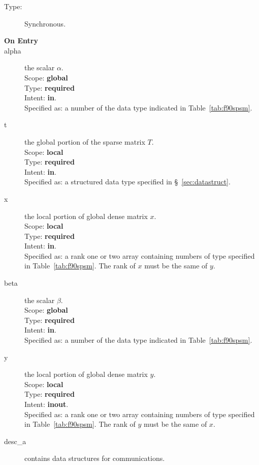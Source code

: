 \begin{description}
\item[Type:] Synchronous.
\item[\bf On Entry]
\item[alpha] the scalar $\alpha$.\\
Scope: {\bf global} \\
Type: {\bf required}\\
Intent: {\bf in}.\\
Specified as: a number of the data type indicated in
Table~\ref{tab:f90spsm}.
\item[t] the global portion of the sparse matrix
$T$.  \\ 
Scope: {\bf local} \\
Type: {\bf required}\\
Intent: {\bf in}.\\
Specified as: a structured data type specified in
\S~\ref{sec:datastruct}.
\item[x] the local portion of global dense matrix
$x$. %
\\
Scope: {\bf local} \\
Type: {\bf required} \\
Intent: {\bf in}.\\
Specified as:  a rank one or two array 
containing numbers of type specified in
Table~\ref{tab:f90spsm}.  The rank of $x$ must be the same of $y$. 
\item[beta] the scalar $\beta$.\\
Scope: {\bf global} \\
Type: {\bf required} \\
Intent: {\bf in}.\\
Specified as: a number of the data type indicated in Table~\ref{tab:f90spsm}.
\item[y] the local portion of global dense matrix
$y$. %
\\
Scope: {\bf local} \\
Type: {\bf required} \\
Intent: {\bf inout}.\\
Specified as:  a rank one or two array 
containing numbers of type specified in
Table~\ref{tab:f90spsm}. The rank of $y$ must be the same of $x$. 
\item[desc\_a] contains data structures for communications.\\

\end{description}
